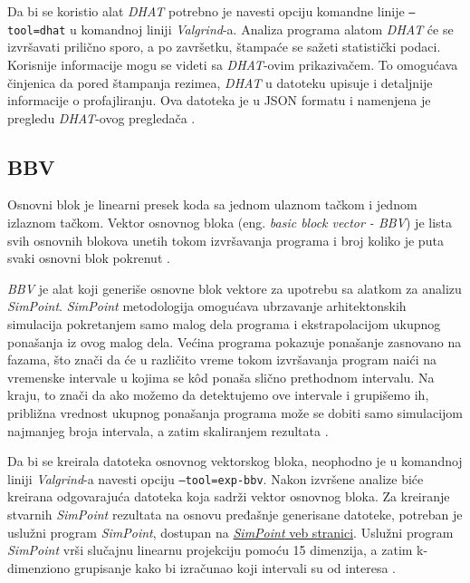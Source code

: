\documentclass[12pt,oneside]{memoir}
\theoremstyle{plain}
\theoremstyle{definition}
\begin{document}
Da bi se koristio alat \textit{ DHAT} potrebno je navesti opciju komandne linije \texttt{–tool=dhat} u komandnoj liniji \textit{Valgrind}-a. Analiza programa alatom \textit{DHAT} će se izvršavati prilično sporo, a po završetku, štampaće se sažeti statistički podaci. Korisnije informacije mogu se videti sa \textit{DHAT}-ovim prikazivačem. To omogućava činjenica da pored štampanja rezimea, \textit{DHAT} u datoteku upisuje i detaljnije informacije o profajliranju. Ova datoteka je u JSON formatu i namenjena je pregledu \textit{DHAT}-ovog pregledača \cite{DHAT}. 

\subsection{BBV}

Osnovni blok je linearni presek koda sa jednom ulaznom tačkom i jednom izlaznom tačkom. Vektor osnovnog bloka (eng. \textit{basic block vector - BBV}) je lista svih osnovnih blokova unetih tokom izvršavanja programa i broj koliko je puta svaki osnovni blok pokrenut \cite{BBV}. 

\textit{BBV} je alat koji generiše osnovne blok vektore za upotrebu sa alatkom za analizu \textit{SimPoint}. \textit{SimPoint} metodologija omogućava ubrzavanje arhitektonskih simulacija pokretanjem samo malog dela programa i ekstrapolacijom ukupnog ponašanja iz ovog malog dela. Većina programa pokazuje ponašanje zasnovano na fazama, što znači da će u različito vreme tokom izvršavanja program naići na vremenske intervale u kojima se k\^od ponaša slično prethodnom intervalu. Na kraju, to znači da ako možemo da detektujemo ove intervale i grupišemo ih, približna vrednost ukupnog ponašanja programa može se dobiti samo simulacijom najmanjeg broja intervala, a zatim skaliranjem rezultata \cite{BBV}.

Da bi se kreirala datoteka osnovnog vektorskog bloka, neophodno je u komandnoj liniji \textit{Valgrind}-a navesti opciju \texttt{–tool=exp-bbv}. Nakon izvršene analize biće kreirana odgovarajuća datoteka koja sadrži vektor osnovnog bloka. Za kreiranje stvarnih \textit{SimPoint} rezultata na osnovu pređašnje generisane datoteke, potreban je uslužni program \textit{SimPoint}, dostupan na \href{http://cseweb.ucsd.edu/~calder/simpoint/}{\textit{SimPoint} veb stranici}. Uslužni program \textit{SimPoint} vrši slučajnu linearnu projekciju pomoću 15 dimenzija, a zatim k-dimenziono grupisanje kako bi izračunao koji intervali su od interesa \cite{BBV}.  

\end{document}
